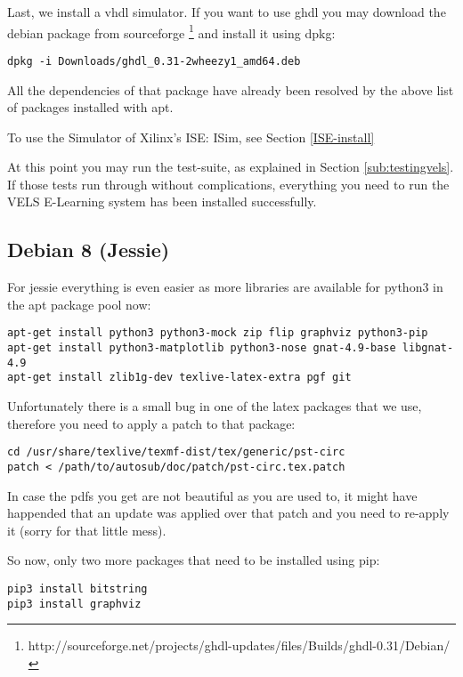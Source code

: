 Last, we install a vhdl simulator. If you want to use ghdl you may download
the debian package from sourceforge \footnote{http://sourceforge.net/projects/ghdl-updates/files/Builds/ghdl-0.31/Debian/} and install it using dpkg:

\begin{verbatim}
dpkg -i Downloads/ghdl_0.31-2wheezy1_amd64.deb
\end{verbatim}

All the dependencies of that package have already been resolved by the above
list of packages installed with apt.

To use the Simulator of Xilinx's ISE: ISim, see Section \ref{ISE-install}

At this point you may run the test-suite, as explained in Section \ref{sub:testingvels}.
If those tests run through without complications, everything you need to run the VELS
E-Learning system has been installed successfully.

\subsection{Debian 8 (Jessie)}

For jessie everything is even easier as more libraries are available for python3 in the
apt package pool now:

\begin{verbatim}
apt-get install python3 python3-mock zip flip graphviz python3-pip
apt-get install python3-matplotlib python3-nose gnat-4.9-base libgnat-4.9
apt-get install zlib1g-dev texlive-latex-extra pgf git
\end{verbatim}

Unfortunately there is a small bug in one of the latex packages that we use,
therefore you need to apply a patch to that package:

\begin{verbatim}
cd /usr/share/texlive/texmf-dist/tex/generic/pst-circ
patch < /path/to/autosub/doc/patch/pst-circ.tex.patch
\end{verbatim}

In case the pdfs you get are not beautiful as you are used to, it might have
happended that an update was applied over that patch and you need to re-apply it (sorry for that little mess).

So now, only two more packages that need to be installed using pip:

\begin{verbatim}
pip3 install bitstring
pip3 install graphviz
\end{verbatim}

